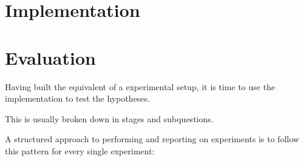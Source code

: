 \documentclass[ twoside,openright,titlepage,numbers=noenddot,headinclude,%
                footinclude=true,cleardoublepage=empty,abstractoff, %
                BCOR=5mm,paper=a4,fontsize=11pt,%
                ngerman,american,%
                ]{scrreprt}
\begin{document}
\chapter{Implementation}
\label{cha:implementation}




%
%


\chapter{Evaluation}
\label{cha:evaluation}

Having built the equivalent of a experimental setup, it is time to use
the implementation to test the hypotheses.

This is usually broken down in stages and subquestions.

A structured approach to performing and reporting on experiments is
to follow this pattern for every single experiment:
\end{document}
